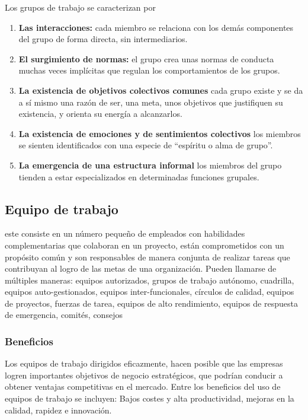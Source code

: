 Los grupos de trabajo se caracterizan por
\begin{enumerate}
    \item \textbf{Las interacciones: } cada miembro se relaciona con los
    demás componentes del grupo de forma directa, sin intermediarios.
    
    \item \textbf{El surgimiento de normas: } el grupo crea unas normas
    de conducta muchas veces implícitas que regulan los comportamientos
    de los grupos.

    \item \textbf{La existencia de objetivos colectivos comunes}
    cada grupo existe y se da a sí mismo una razón de ser, una meta,
    unos objetivos que justifiquen su existencia, y orienta su energía
    a alcanzarlos.

    \item \textbf{La existencia de emociones y de sentimientos
    colectivos}
    los miembros se sienten identificados con una especie de
    “espíritu o alma de grupo”.

    \item \textbf{La emergencia de una estructura informal}
    los miembros del grupo tienden a estar especializados en
    determinadas funciones grupales.
\end{enumerate}

\subsection{Equipo de trabajo}
este consiste en un número pequeño de empleados con habilidades
complementarias que colaboran en un proyecto, están comprometidos
con un propósito común y son responsables de manera conjunta de
realizar tareas que contribuyan al logro de las metas de una
organización. Pueden llamarse de múltiples maneras: equipos
autorizados, grupos de trabajo autónomo, cuadrilla, equipos
auto-gestionados, equipos inter-funcionales, círculos de calidad,
equipos de proyectos, fuerzas de tarea, equipos de alto rendimiento,
equipos de respuesta de emergencia, comités, consejos

\subsubsection{Beneficios}
Los equipos de trabajo dirigidos eficazmente, hacen posible que las
empresas logren importantes objetivos de negocio estratégicos, que
podrían conducir a obtener ventajas competitivas en el mercado.
Entre los beneficios del uso de equipos de trabajo se incluyen:
Bajos costes y alta productividad, mejoras en la calidad, rapidez e
innovación.


